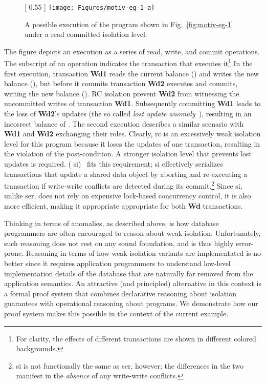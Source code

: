 \begin{figure}[!h]
\centering
{} [
  0.55\columnwidth
] {
  \texttt{[image: Figures/motiv-eg-1-a]}
}
\caption{A possible execution of the program shown in Fig.~\ref{fig:motiv-eg-1} under
  a read committed isolation level.}
\end{figure}
The figure depicts an execution as a series of read, write, and commit
operations.  The subscript of an operation indicates the transaction
that executes it\footnote{For clarity, the effects of different
  transactions are shown in different colored backgrounds.} In the
first execution, transaction {\bf Wd1} reads the current balance
() and writes the new balance (), but before it commits
transaction {\bf Wd2} executes and commits, writing the new balance
(). RC isolation prevent {\bf Wd2} from witnessing the
uncommitted writes of transaction {\bf Wd1}.  Subsequently committing
{\bf Wd1} leads to the loss of {\bf Wd2}'s updates (the so called
\emph{lost update anomaly}~\cite{berenson}), resulting in an incorrect
balance of . The second execution describes a similar scenario
with {\bf Wd1} and {\bf Wd2} exchanging their roles.  Clearly, {\sc
  rc} is an excessively weak isolation level for this program because
it loses the updates of one transaction, resulting in the violation of
the post-condition.  A stronger isolation level that prevents lost
updates is required.   ({\sc
  si})~\cite{berenson} fits this requirement; {\sc si} effectively
serializes transactions that update a shared data object by aborting
and re-executing a transaction if write-write conflicts are detected
during its commit.\footnote{{\sc si} is not functionally the same as
  {\sc ser}, however; the differences in the two manifest in the \emph{absence}
  of any write-write conflicts.}   Since {\sc si},
unlike {\sc ser}, does not rely on expensive lock-based
concurrency control, it is also more efficient, making it appropriate
appropriate for both {\bf Wd} transactions.

Thinking in terms of anomalies, as described above, is how database
programmers are often encouraged to reason about weak isolation.
Unfortunately, such reasoning does not rest on any sound foundation,
and is thus highly error-prone. Reasoning in terms of how weak
isolation variants are implementated is no better since it requires
application programmers to understand low-level implementation details
of the database that are naturally far removed from the application
semantics. An attractive (and principled) alternative in this context
is a formal proof system that combines declarative reasoning about
isolation guarantees with operational reasoning about programs. We
demonstrate how our proof system makes this possible in the context of
the current example.

